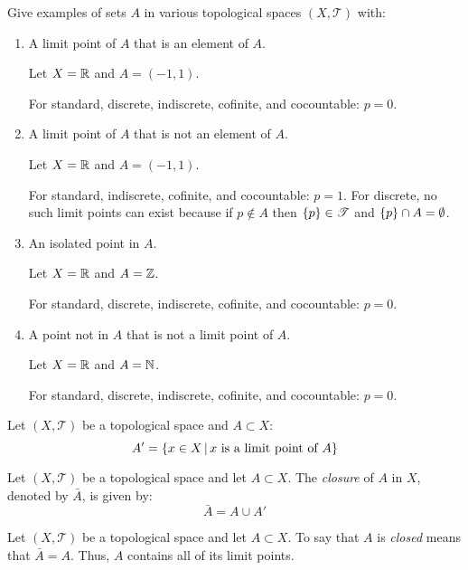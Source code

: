 \documentclass[letterpaper,12pt,fleqn]{article}
\newcommand{\T}{\mathscr{T}}
\begin{document}
\begin{example}
  Give examples of sets \(A\) in various topological spaces \((X,\T)\) with:

  \begin{enumerate}
  \item A limit point of \(A\) that is an element of \(A\).

    Let \(X=\mathbb{R}\) and \(A=(-1,1)\).

    For standard, discrete, indiscrete, cofinite, and cocountable: \(p=0\).

  \item A limit point of \(A\) that is not an element of \(A\).

    Let \(X=\mathbb{R}\) and \(A=(-1,1)\).

    For standard, indiscrete, cofinite, and cocountable: \(p=1\).  For discrete, no such limit points can exist
    because if \(p\notin A\) then \(\set{p}\in\T\) and \(\{p\}\cap A=\emptyset\).

  \item An isolated point in \(A\).
    
    Let \(X=\mathbb{R}\) and \(A=\mathbb{Z}\).

    For standard, discrete, indiscrete, cofinite, and cocountable: \(p=0\).

  \item A point not in \(A\) that is not a limit point of \(A\).

    Let \(X=\mathbb{R}\) and \(A=\mathbb{N}\).

    For standard, discrete, indiscrete, cofinite, and cocountable: \(p=0\).
  \end{enumerate}
\end{example}

\begin{notation}
  Let \((X,\T)\) be a topological space and \(A\subset X\):
  \[A'=\left\{{x\in X}\,\middle|\,{x\ \text{is a limit point of}\ A}\right\}\]
\end{notation}

\begin{definition}[Closure]
  Let \((X,\T)\) be a topological space and let \(A\subset X\).  The \emph{closure} of \(A\) in \(X\), denoted by
  \(\bar{A}\), is given by:
  \[\bar{A}=A\cup A'\]
\end{definition}

\begin{definition}[Closed]
  Let \((X,\T)\) be a topological space and let \(A\subset X\).  To say that \(A\) is \emph{closed} means that
  \(\bar{A}=A\).  Thus, \(A\) contains all of its limit points.
\end{definition}
\end{document}
